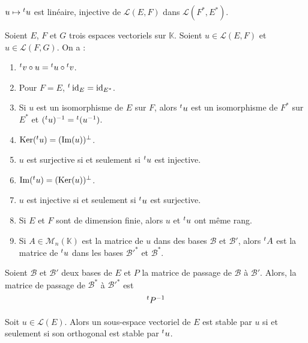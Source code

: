   \begin{proposition}
    $u \mapsto \mathstrut ^t u$ est linéaire, injective de $\mathcal{L}(E,F)$ dans $\mathcal{L}(F^*,E^*)$.
  \end{proposition}

  \begin{theorem}
    Soient $E$, $F$ et $G$ trois espaces vectoriels sur $\mathbb{K}$. Soient $u \in \mathcal{L}(E,F)$ et $u \in \mathcal{L}(F,G)$. On a :
    \begin{enumerate}[label={\bfseries(\roman*)}]
      \item $\mathstrut ^t v \circ u = \mathstrut ^t u \circ \mathstrut ^t v$.
      \item Pour $F = E$, $\mathstrut ^t \operatorname{id}_E = \operatorname{id}_{E^*}$.
      \item Si $u$ est un isomorphisme de $E$ sur $F$, alors $\mathstrut ^t u$ est un isomorphisme de $F^*$ sur $E^*$ et $(\mathstrut ^t u)^{-1} = \mathstrut ^t (u^{-1})$.
      \item $\mathrm{Ker}(\mathstrut ^t u) = (\mathrm{Im}(u))^{\perp}$.
      \item $u$ est surjective si et seulement si $\mathstrut ^t u$ est injective.
      \item $\mathrm{Im}(\mathstrut ^t u) = (\mathrm{Ker}(u))^{\perp}$.
      \item $u$ est injective si et seulement si $\mathstrut ^t u$ est surjective.
      \item Si $E$ et $F$ sont de dimension finie, alors $u$ et $\mathstrut ^t u$ ont même rang.
      \item Si $A \in \mathcal{M}_n(\mathbb{K})$ est la matrice de $u$ dans des bases $\mathcal{B}$ et $\mathcal{B}'$, alors $\mathstrut ^t A$ est la matrice de $\mathstrut ^t u$ dans les bases $\mathcal{B}'^*$ et $\mathcal{B}^*$.
    \end{enumerate}
  \end{theorem}


  \begin{corollary}
    Soient $\mathcal{B}$ et $\mathcal{B}'$ deux bases de $E$ et $P$ la matrice de passage de $\mathcal{B}$ à $\mathcal{B}'$. Alors, la matrice de passage de $\mathcal{B}^*$ à $\mathcal{B}'^*$ est
    \[ \mathstrut ^t P^{-1} \]
  \end{corollary}

  \begin{proposition}
    Soit $u \in \mathcal{L}(E)$. Alors un sous-espace vectoriel de $E$ est stable par $u$ si et seulement si son orthogonal est stable par $\mathstrut ^t u$.
  \end{proposition}

